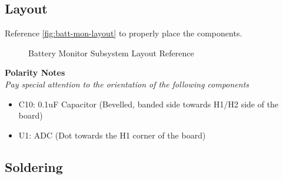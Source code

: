 \documentclass{article}
\begin{document}
\subsection{Layout}

Reference \autoref{fig:batt-mon-layout} to properly place the components.

\begin{figure}[H]
    \centering
        \qquad
        \caption{Battery Monitor Subsystem Layout Reference}%
    \label{fig:batt-mon-layout}%
\end{figure}

\noindent \textbf{Polarity Notes}\\
\noindent \textit{Pay special attention to the orientation of the following components}
\begin{itemize}
  \item C10: 0.1uF Capacitor (Bevelled, banded side towards H1/H2 side of the board)
  \item U1: ADC (Dot towards the H1 corner of the board)
\end{itemize}

\subsection{Soldering}
\end{document}
